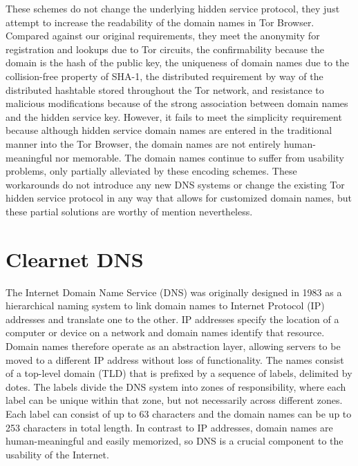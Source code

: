 These schemes do not change the underlying hidden service protocol, they just attempt to increase the readability of the domain names in Tor Browser. Compared against our original requirements, they meet the anonymity for registration and lookups due to Tor circuits, the confirmability because the domain is the hash of the public key, the uniqueness of domain names due to the collision-free property of SHA-1, the distributed requirement by way of the distributed hashtable stored throughout the Tor network, and resistance to malicious modifications because of the strong association between domain names and the hidden service key. However, it fails to meet the simplicity requirement because although hidden service domain names are entered in the traditional manner into the Tor Browser, the domain names are not entirely human-meaningful nor memorable. The domain names continue to suffer from usability problems, only partially alleviated by these encoding schemes. These workarounds do not introduce any new DNS systems or change the existing Tor hidden service protocol in any way that allows for customized domain names, but these partial solutions are worthy of mention nevertheless.



\section{Clearnet DNS}

The Internet Domain Name Service (DNS) was originally designed in 1983 as a hierarchical naming system to link domain names to Internet Protocol (IP) addresses and translate one to the other. IP addresses specify the location of a computer or device on a network and domain names identify that resource. Domain names therefore operate as an abstraction layer, allowing servers to be moved to a different IP address without loss of functionality. The names consist of a top-level domain (TLD) that is prefixed by a sequence of labels, delimited by dotes. The labels divide the DNS system into zones of responsibility, where each label can be unique within that zone, but not necessarily across different zones. Each label can consist of up to 63 characters and the domain names can be up to 253 characters in total length. In contrast to IP addresses, domain names are human-meaningful and easily memorized, so DNS is a crucial component to the usability of the Internet.

